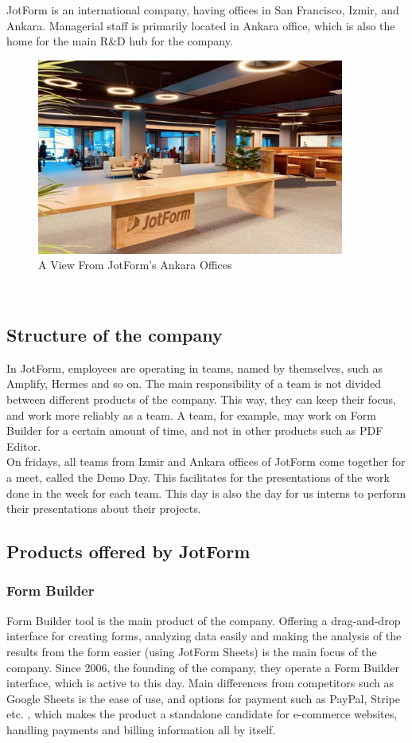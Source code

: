 JotForm is an international company, having offices in San Francisco, Izmir, and Ankara. Managerial
staff is primarily located in Ankara office, which is also the home for the main R\&D hub for the company. \\
\begin{figure}[hbt!]
    \centering
    \includegraphics[width=0.9\textwidth]{Images/new-turkey-office.jpg}
    \caption{A View From JotForm's Ankara Offices}
    \label{fig:JFMAnkara}
\end{figure} \\
\subsection{Structure of the company}
In JotForm, employees are operating in teams, named by themselves, such as Amplify, Hermes and so on. The main responsibility of a team is not divided between different products of the company. This way, they can keep their focus, and work more reliably as a team. A team, for example, may work on Form Builder for a certain amount of time, and not in other products such as PDF Editor. \\
On fridays, all teams from Izmir and Ankara offices of JotForm come together for a meet, called the Demo Day. This facilitates for the presentations of the work done in the week for each team. This day is also the day for us interns to perform their presentations about their projects.

\subsection{Products offered by JotForm}
\subsubsection{Form Builder}
Form Builder tool is the main product of the company. Offering a drag-and-drop interface for creating forms,
analyzing data easily and making the analysis of the results from the form easier (using JotForm Sheets) is the main focus of the company. Since 2006, the founding of the company, they operate a Form Builder interface, which is active to this day. Main differences from competitors such as Google Sheets is the ease of use, and options for payment such as PayPal, Stripe etc. , which makes the product a standalone candidate for e-commerce websites, handling payments and billing information all by itself.


